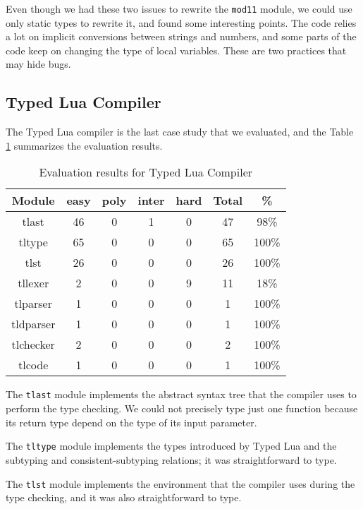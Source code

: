 Even though we had these two issues to rewrite the \texttt{mod11} module,
we could use only static types to rewrite it, and found some interesting
points.
The code relies a lot on implicit conversions between strings and numbers,
and some parts of the code keep on changing the type of local variables.
These are two practices that may hide bugs.

\subsection{Typed Lua Compiler}

The Typed Lua compiler is the last case study that we evaluated, and the
Table \ref{tab:evaltlc} summarizes the evaluation results.

\begin{table}[!ht]
\begin{center}
\begin{tabular}{|c|c|c|c|c|c|c|}
\hline
\textbf{Module} & \textbf{easy} & \textbf{poly} & \textbf{inter} & \textbf{hard} & \textbf{Total} & \textbf{\%} \\
\hline
tlast & 46 & 0 & 1 & 0 & 47 & 98\% \\
\hline
tltype & 65 & 0 & 0 & 0 & 65 & 100\% \\
\hline
tlst & 26 & 0 & 0 & 0 & 26 & 100\% \\
\hline
tllexer & 2 & 0 & 0 & 9 & 11 & 18\% \\
\hline
tlparser & 1 & 0 & 0 & 0 & 1 & 100\% \\
\hline
tldparser & 1 & 0 & 0 & 0 & 1 & 100\% \\
\hline
tlchecker & 2 & 0 & 0 & 0 & 2 & 100\% \\
\hline
tlcode & 1 & 0 & 0 & 0 & 1 & 100\% \\
\hline
\end{tabular}
\end{center}
\caption{Evaluation results for Typed Lua Compiler}
\label{tab:evaltlc}
\end{table}

The \texttt{tlast} module implements the abstract syntax tree that
the compiler uses to perform the type checking.
We could not precisely type just one function because its return
type depend on the type of its input parameter.

The \texttt{tltype} module implements the types introduced by
Typed Lua and the subtyping and consistent-subtyping relations;
it was straightforward to type.

The \texttt{tlst} module implements the environment that the
compiler uses during the type checking, and it was also straightforward
to type.


